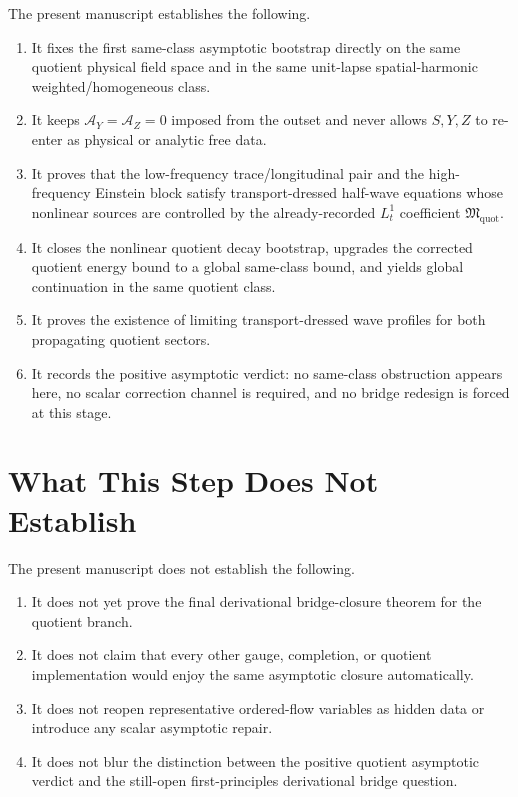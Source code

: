 \documentclass[11pt]{article}
\newcommand{\AY}{\mathcal A_Y}
\newcommand{\AZ}{\mathcal A_Z}
\begin{document}
The present manuscript establishes the following.
\begin{enumerate}
    \item It fixes the first same-class asymptotic bootstrap directly on the same quotient physical field space and in the same unit-lapse spatial-harmonic weighted/homogeneous class.
    \item It keeps \(\AY=\AZ=0\) imposed from the outset and never allows \(S,Y,Z\) to re-enter as physical or analytic free data.
    \item It proves that the low-frequency trace/longitudinal pair and the high-frequency Einstein block satisfy transport-dressed half-wave equations whose nonlinear sources are controlled by the already-recorded \(L_t^1\) coefficient \(\mathfrak M_{\mathrm{quot}}\).
    \item It closes the nonlinear quotient decay bootstrap, upgrades the corrected quotient energy bound to a global same-class bound, and yields global continuation in the same quotient class.
    \item It proves the existence of limiting transport-dressed wave profiles for both propagating quotient sectors.
    \item It records the positive asymptotic verdict: no same-class obstruction appears here, no scalar correction channel is required, and no bridge redesign is forced at this stage.
\end{enumerate}

\section{What This Step Does Not Establish}

The present manuscript does not establish the following.
\begin{enumerate}
    \item It does not yet prove the final derivational bridge-closure theorem for the quotient branch.
    \item It does not claim that every other gauge, completion, or quotient implementation would enjoy the same asymptotic closure automatically.
    \item It does not reopen representative ordered-flow variables as hidden data or introduce any scalar asymptotic repair.
    \item It does not blur the distinction between the positive quotient asymptotic verdict and the still-open first-principles derivational bridge question.
\end{enumerate}
\end{document}
